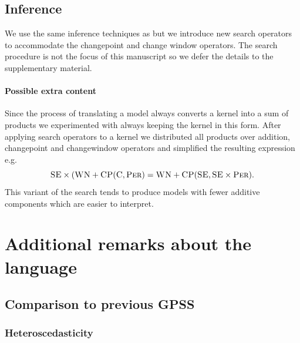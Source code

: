 \documentclass{article}
\def\eg{e.g.\ }
\begin{document}

\subsection{Inference}

We use the same inference techniques as \cite{DuvLloGroetal13} but we introduce new search operators to accommodate the changepoint and change window operators.
The search procedure is not the focus of this manuscript so we defer the details to the supplementary material.

\paragraph{Possible extra content}


Since the process of translating a model always converts a kernel into a sum of products we experimented with always keeping the kernel in this form.
After applying search operators to a kernel we distributed all products over addition, changepoint and changewindow operators and simplified the resulting expression \eg
\begin{equation}
{\textsc{SE}} \times ({\textsc{WN}} + {\textsc{CP}}({\textsc{C}}, {\textsc{Per}}) = {\textsc{WN}} + {\textsc{CP}}({\textsc{SE}}, {\textsc{SE}} \times {\textsc{Per}}).
\end{equation}
This variant of the search tends to produce models with fewer additive components which are easier to interpret.

\section{Additional remarks about the language}


\subsection{Comparison to previous GPSS}

\subsubsection{Heteroscedasticity}
\end{document}
